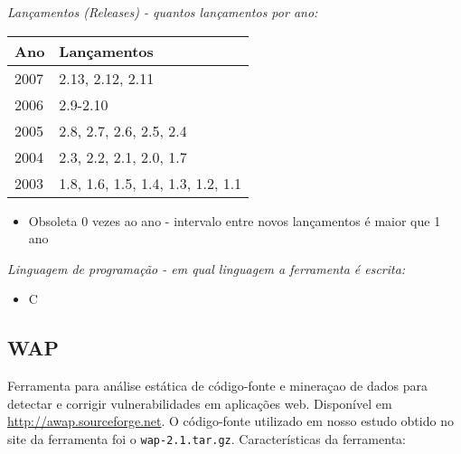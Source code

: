 \begin{description}

  \item {\it Lançamentos ({\it Releases}) - quantos lançamentos por ano:}
    \begin{table}[h!]
      \centering
      \begin{tabular}{| l | l |}
        \hline
        Ano  & Lançamentos                       \\
        \hline
        2007 & 2.13, 2.12, 2.11                  \\
        2006 & 2.9-2.10                          \\
        2005 & 2.8, 2.7, 2.6, 2.5, 2.4           \\
        2004 & 2.3, 2.2, 2.1, 2.0, 1.7           \\
        2003 & 1.8, 1.6, 1.5, 1.4, 1.3, 1.2, 1.1 \\
        \hline
      \end{tabular}
    \end{table}
    \begin{itemize}
      \item Obsoleta $0$ vezes ao ano - intervalo entre novos lançamentos é maior que 1 ano
    \end{itemize}

  \item {\it Linguagem de programação - em qual linguagem a ferramenta é escrita:}
    \begin{itemize}
      \item C
    \end{itemize}

\end{description}

\subsection{WAP}

Ferramenta para análise estática de código-fonte e mineraçao de dados para
detectar e corrigir vulnerabilidades em aplicações web. Disponível em
\url{http://awap.sourceforge.net}. O código-fonte utilizado em nosso estudo
obtido no site da ferramenta foi o \texttt{wap-2.1.tar.gz}. Características da
ferramenta:

